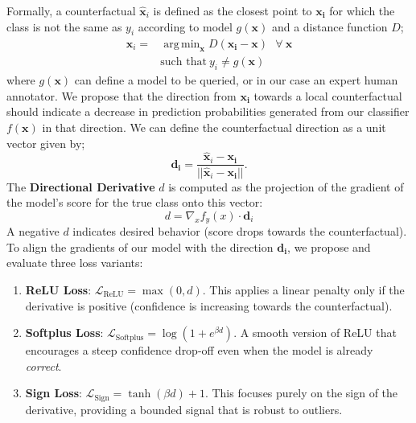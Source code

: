 \documentclass[sigconf,anonymous]{aamas}
\DeclareMathOperator*{\argmin}{arg\,min}
\begin{document}
Formally, a counterfactual $\hat{\mathbf{x}}_i$ is defined as the closest point to $\mathbf{x_i}$ for which the class is not the same as $y_i$ according to model $g(\mathbf{x})$ and a distance function $D$;
\begin{equation}\label{eq:counterfactual}
\begin{aligned}
    \hat{\mathbf{x}}_i =& \argmin_{\mathbf{x}} D(\mathbf{x_i}-\mathbf{x}) \ \ \ \forall \ \mathbf{x} \\ &	\text{such that} \ y_i \neq g(\mathbf{x})
\end{aligned}
\end{equation}
where $g(\mathbf{x})$ can define a model to be queried, or in our case an expert human annotator. We propose that the direction from $\mathbf{x_i}$ towards a local counterfactual should indicate a decrease in prediction probabilities generated from our classifier $f(\mathbf{x})$ in that direction. We can define the counterfactual direction as a unit vector given by; 
\begin{equation}
    \mathbf{d_i}=\frac{\mathbf{\hat{x}}_i - \mathbf{x_i}}{||\mathbf{\hat{x}}_i - \mathbf{x_i}||}. \label{eq:dir_unit}
\end{equation}
The \textbf{Directional Derivative} $d$ is computed as the projection of the gradient of the model's score for the true class onto this vector:
\begin{equation}
    d = \nabla_x f_{y}(x) \cdot \mathbf{d}_{i}
\end{equation}
A negative $d$ indicates desired behavior (score drops towards the counterfactual). To align the gradients of our model with the direction $\mathbf{d_i}$, we propose and evaluate three loss variants:

\begin{enumerate}
    \item \textbf{ReLU Loss}: $\mathcal{L}_{\text{ReLU}} = \max(0, d)$. This applies a linear penalty only if the derivative is positive (confidence is increasing towards the counterfactual).
    \item \textbf{Softplus Loss}: $\mathcal{L}_{\text{Softplus}} = \log(1 + e^{\beta d})$. A smooth version of ReLU that encourages a steep confidence drop-off even when the model is already \emph{correct}.
    
    \item \textbf{Sign Loss}: $\mathcal{L}_{\text{Sign}} = \tanh(\beta d) + 1$. This focuses purely on the sign of the derivative, providing a bounded signal that is robust to outliers.
\end{enumerate}
\end{document}
